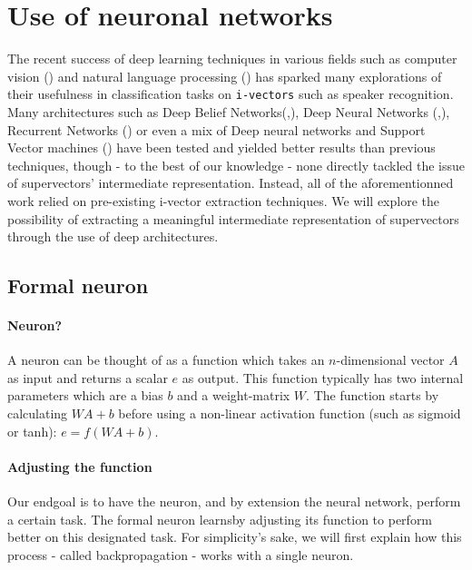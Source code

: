 \documentclass[conference]{IEEEtran}
\begin{document}
\section{Use of neuronal networks}

The recent success of deep learning techniques in various fields such as
computer vision (\cite{lecun1998gradient}) and natural language processing (\cite{bordes2012joint}) has sparked
many explorations of their usefulness in classification tasks on
\texttt{i-vectors} such as speaker recognition. Many architectures such as Deep
Belief Networks(\cite{DBLP:journals/corr/GhahabiH15},\cite{ghahabi2014deep}),
Deep Neural Networks
(\cite{DBLP:journals/corr/GhahabiH15},\cite{ghahabi2014deep}), Recurrent
Networks (\cite{DBLP:journals/corr/SaonSRK16}) or even a mix of
Deep neural networks and Support Vector machines (\cite{richardson2015deep}) have been tested and yielded
better results than previous techniques, though - to the best of our knowledge -
none directly tackled the issue of supervectors' intermediate representation.
Instead, all of the aforementionned work relied on pre-existing i-vector
extraction techniques. We will explore the possibility of extracting a
meaningful intermediate representation of supervectors through the use of deep architectures.

\subsection{Formal neuron}

\paragraph{Neuron?}
A neuron can be thought of as a function which takes an $n$-dimensional vector
$A$ as input and returns a scalar $e$ as output. This function typically has two
internal parameters which are a bias $b$ and a weight-matrix $W$. The function
starts by calculating $WA+b$ before using a non-linear activation function (such as sigmoid or tanh): $e=f(WA+b)$.

\paragraph{Adjusting the function}

Our endgoal is to have the neuron, and by extension the neural network, perform
a certain task. The formal neuron \og learns\fg by adjusting its function to perform better on
this designated task. For simplicity's sake, we will first explain how this
process - called \og backpropagation\fg{} - works with a single neuron.
\end{document}
